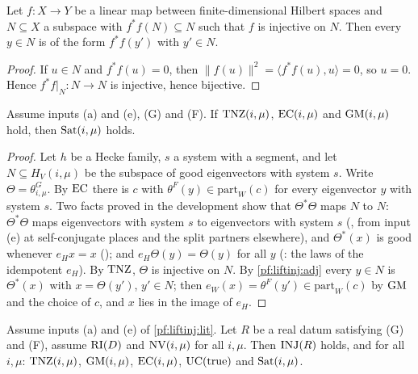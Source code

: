 \begin{lemma}\label{pf:liftinj:adj}
Let $f:X\to Y$ be a linear map between finite-dimensional Hilbert spaces and $N\subseteq X$ a subspace with $f^*f(N)\subseteq N$ such that $f$ is
injective on $N$. Then every $y\in N$ is of the form $f^*f(y')$ with $y'\in N$.
\end{lemma}

\begin{proof}
If $u\in N$ and $f^*f(u)=0$, then $\|f(u)\|^2=\langle f^*f(u),u\rangle=0$, so $u=0$. Hence $f^*f|_N:N\to N$ is injective, hence bijective.
\end{proof}

\begin{lemma}[Saturation]\label{pf:liftinj:sat}
Assume inputs (a) and (e), (G) and (F). If $\mathrm{TNZ}(i,\mu)$, $\mathrm{EC}(i,\mu)$ and $\mathrm{GM}(i,\mu)$ hold, then $\mathrm{Sat}(i,\mu)$
holds.
\end{lemma}

\begin{proof}
Let $h$ be a Hecke family, $s$ a system with a segment, and let $N\subseteq H_V(i,\mu)$ be the subspace of good eigenvectors with system $s$. Write
$\Theta=\theta^G_{i,\mu}$. By $\mathrm{EC}$ there is $c$ with $\theta^F(y)\in\mathrm{part}_W(c)$ for every eigenvector $y$ with system $s$. Two facts proved
in the development show that $\Theta^*\Theta$ maps $N$ to $N$: $\Theta^*\Theta$ maps eigenvectors with system $s$ to eigenvectors with system $s$
(, from input (e) at self-conjugate places and the split partners elsewhere), and $\Theta^*(x)$ is good
whenever $e_Hx=x$ (); and $e_H\Theta(y)=\Theta(y)$ for all $y$
(: the laws of the idempotent $e_H$). By $\mathrm{TNZ}$, $\Theta$ is injective on $N$. By \cref{pf:liftinj:adj}
every $y\in N$ is $\Theta^*(x)$ with $x=\Theta(y')$, $y'\in N$; then $e_W(x)=\theta^F(y')\in\mathrm{part}_W(c)$ by $\mathrm{GM}$ and the choice of $c$,
and $x$ lies in the image of $e_H$.
\end{proof}

\begin{proposition}\label{pf:liftinj:rallis}
Assume inputs (a) and (e) of \cref{pf:liftinj:lit}. Let $R$ be a real datum satisfying (G) and (F), assume $\mathrm{RI}(D)$ and $\mathrm{NV}(i,\mu)$ for
all $i,\mu$. Then $\mathrm{INJ}(R)$ holds, and for all $i,\mu$: $\mathrm{TNZ}(i,\mu)$, $\mathrm{GM}(i,\mu)$, $\mathrm{EC}(i,\mu)$,
$\mathrm{UC}(\mathrm{true})$ and $\mathrm{Sat}(i,\mu)$.
\end{proposition}

